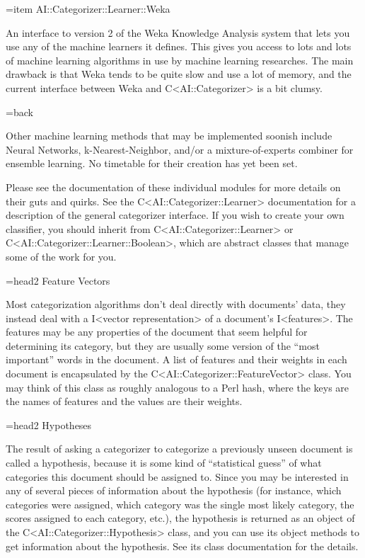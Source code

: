 \documentclass[a4paper]{report}
\begin{document}
=item AI::Categorizer::Learner::Weka

An interface to version 2 of the Weka Knowledge Analysis system that
lets you use any of the machine learners it defines.  This gives you
access to lots and lots of machine learning algorithms in use by
machine learning researches.  The main drawback is that Weka tends to
be quite slow and use a lot of memory, and the current interface
between Weka and C<AI::Categorizer> is a bit clumsy.

=back

Other machine learning methods that may be implemented soonish include
Neural Networks, k-Nearest-Neighbor, and/or a mixture-of-experts
combiner for ensemble learning.  No timetable for their creation has
yet been set.

Please see the documentation of these individual modules for more
details on their guts and quirks.  See the C<AI::Categorizer::Learner>
documentation for a description of the general categorizer interface.
If you wish to create your own classifier, you should inherit from
C<AI::Categorizer::Learner> or C<AI::Categorizer::Learner::Boolean>,
which are abstract classes that manage some of the work for you.

=head2 Feature Vectors

Most categorization algorithms don't deal directly with documents'
data, they instead deal with a I<vector representation> of a
document's I<features>.  The features may be any properties of the
document that seem helpful for determining its category, but they are
usually
some version of the ``most important'' words in the document.  A list
of
features and their weights in each document is encapsulated by the
C<AI::Categorizer::FeatureVector> class.  You may think of this class
as roughly analogous to a Perl hash, where the keys are the names of
features and the values are their weights.

=head2 Hypotheses

The result of asking a categorizer to categorize a previously unseen
document is called a hypothesis, because it is some kind of
``statistical guess'' of what categories this document should be
assigned to.  Since you may be interested in any of several pieces of
information about the hypothesis (for instance, which categories were
assigned, which category was the single most likely category, the
scores assigned to each category, etc.), the hypothesis is returned as
an object of the C<AI::Categorizer::Hypothesis> class, and you can use
its object methods to get information about the hypothesis.  See its
class documentation for the details.
\end{document}

